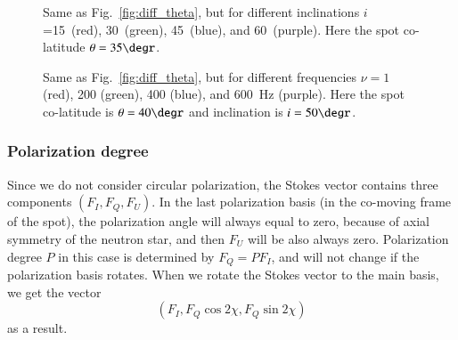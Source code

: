 \documentclass{aa}
\newcommand{\be}{\begin{equation}}
\newcommand{\ee}{\end{equation}}
\begin{document}
\begin{figure}
\caption{Same as Fig.~\ref{fig:diff_theta}, but for different inclinations $i$=15\degr\ (red), 30\degr\ (green), 45\degr\ (blue), and 60\degr\ (purple).  
Here the spot  co-latitude $\theta = 35\degr$.}
\label{fig:diff_incl}
\end{figure}

\begin{figure}
\caption{Same as Fig.~\ref{fig:diff_theta}, but for different frequencies $\nu = 1$  (red),  200 (green), 400 (blue), and 600~Hz (purple).
Here the spot co-latitude is $\theta = 40\degr$ and inclination is $i=50\degr$. }
    \label{fig:diff_nu}
\end{figure}


\subsubsection{Polarization degree}

Since we do not consider circular polarization, the Stokes vector contains three components $(F_I,F_Q,F_U)$.
In the last polarization basis (in the co-moving frame of the spot), the polarization angle will always equal to zero, because of axial symmetry of the neutron star, and then $F_U$ will be also always zero. Polarization degree $P$ in this case is determined by  $F_Q=P F_I$, and will not change if the polarization basis rotates. When we rotate the Stokes vector to the main basis, we get the vector 
\be
(F_I, F_Q \cos{2\chi},F_Q \sin{2\chi})
\ee
as a result.
\end{document}
